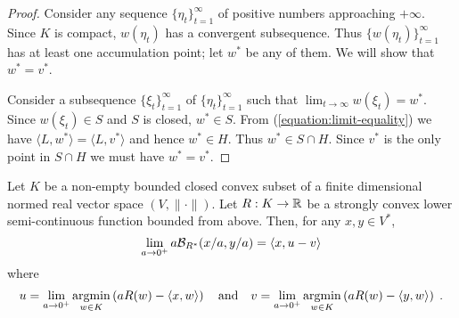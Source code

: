 \begin{proof}
Consider any sequence $\{\eta_t\}_{t=1}^\infty$ of positive numbers approaching
$+\infty$.  Since $K$ is compact, $w(\eta_t)$ has a convergent subsequence.
Thus $\{w(\eta_t)\}_{t=1}^\infty$ has at least one accumulation point; let
$w^*$ be any of them. We will show that $w^* = v^*$.

Consider a subsequence $\{\xi_t\}_{t=1}^\infty$ of $\{\eta_t\}_{t=1}^\infty$
such that $\lim_{t \to \infty} w(\xi_t) = w^*$.  Since $w(\xi_t) \in S$ and $S$
is closed, $w^* \in S$.  From (\ref{equation:limit-equality}) we have $\langle
L, w^* \rangle = \langle L, v^* \rangle$ and hence $w^* \in H$. Thus $w^* \in S
\cap H$.  Since $v^*$ is the only point in $S \cap H$ we must have $w^* = v^*$.
\end{proof}

\begin{lemma}
\label{lemma:limit-bregman-divergence}
Let $K$ be a non-empty bounded closed convex subset of a finite dimensional
normed real vector space $(V, \|\cdot\|)$.  Let $R:K \to \mathbb{R}$ be a strongly
convex lower semi-continuous function bounded from above. Then, for any $x,y
\in V^*$,
$$
\lim_{a \to 0^+} a \mathcal{B}_{R^*}(x/a, y/a) = \langle x, u - v \rangle \\
$$
where
\begin{align*}
u = \lim_{a \to 0^+} \operatorname*{argmin}_{w \in K} \left( a R(w) - \langle x, w \rangle \right)
\quad \text{and} \quad
v = \lim_{a \to 0^+} \operatorname*{argmin}_{w \in K} \left( a R(w) - \langle y, w \rangle \right) \; .
\end{align*}
\end{lemma}


